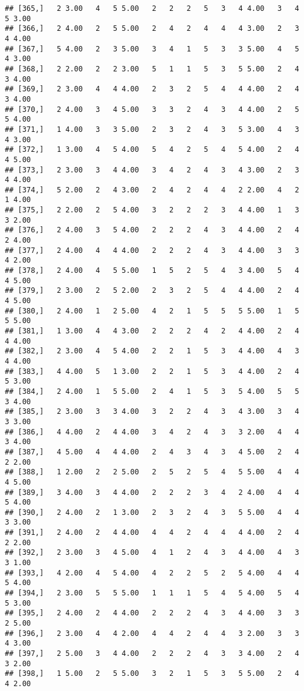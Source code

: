 \documentclass[]{article}
\begin{document}
\begin{verbatim}
## [365,]   2 3.00   4   5 5.00   2   2   2   5   3   4 4.00   3   4   5 3.00
## [366,]   2 4.00   2   5 5.00   2   4   2   4   4   4 3.00   2   3   4 4.00
## [367,]   5 4.00   2   3 5.00   3   4   1   5   3   3 5.00   4   5   4 3.00
## [368,]   2 2.00   2   2 3.00   5   1   1   5   3   5 5.00   2   4   3 4.00
## [369,]   2 3.00   4   4 4.00   2   3   2   5   4   4 4.00   2   4   3 4.00
## [370,]   2 4.00   3   4 5.00   3   3   2   4   3   4 4.00   2   5   5 4.00
## [371,]   1 4.00   3   3 5.00   2   3   2   4   3   5 3.00   4   3   4 3.00
## [372,]   1 3.00   4   5 4.00   5   4   2   5   4   5 4.00   2   4   4 5.00
## [373,]   2 3.00   3   4 4.00   3   4   2   4   3   4 3.00   2   3   4 4.00
## [374,]   5 2.00   2   4 3.00   2   4   2   4   4   2 2.00   4   2   1 4.00
## [375,]   2 2.00   2   5 4.00   3   2   2   2   3   4 4.00   1   3   3 2.00
## [376,]   2 4.00   3   5 4.00   2   2   2   4   3   4 4.00   2   4   2 4.00
## [377,]   2 4.00   4   4 4.00   2   2   2   4   3   4 4.00   3   3   4 2.00
## [378,]   2 4.00   4   5 5.00   1   5   2   5   4   3 4.00   5   4   4 5.00
## [379,]   2 3.00   2   5 2.00   2   3   2   5   4   4 4.00   2   4   4 5.00
## [380,]   2 4.00   1   2 5.00   4   2   1   5   5   5 5.00   1   5   5 5.00
## [381,]   1 3.00   4   4 3.00   2   2   2   4   2   4 4.00   2   4   4 4.00
## [382,]   2 3.00   4   5 4.00   2   2   1   5   3   4 4.00   4   3   4 4.00
## [383,]   4 4.00   5   1 3.00   2   2   1   5   3   4 4.00   2   4   5 3.00
## [384,]   2 4.00   1   5 5.00   2   4   1   5   3   5 4.00   5   5   3 4.00
## [385,]   2 3.00   3   3 4.00   3   2   2   4   3   4 3.00   3   4   3 3.00
## [386,]   4 4.00   2   4 4.00   3   4   2   4   3   3 2.00   4   4   3 4.00
## [387,]   4 5.00   4   4 4.00   2   4   3   4   3   4 5.00   2   4   2 2.00
## [388,]   1 2.00   2   2 5.00   2   5   2   5   4   5 5.00   4   4   4 5.00
## [389,]   3 4.00   3   4 4.00   2   2   2   3   4   2 4.00   4   4   5 4.00
## [390,]   2 4.00   2   1 3.00   2   3   2   4   3   5 5.00   4   4   3 3.00
## [391,]   2 4.00   2   4 4.00   4   4   2   4   4   4 4.00   2   4   2 2.00
## [392,]   2 3.00   3   4 5.00   4   1   2   4   3   4 4.00   4   3   3 1.00
## [393,]   4 2.00   4   5 4.00   4   2   2   5   2   5 4.00   4   4   5 4.00
## [394,]   2 3.00   5   5 5.00   1   1   1   5   4   5 4.00   5   4   5 3.00
## [395,]   2 4.00   2   4 4.00   2   2   2   4   3   4 4.00   3   3   2 5.00
## [396,]   2 3.00   4   4 2.00   4   4   2   4   4   3 2.00   3   3   4 3.00
## [397,]   2 5.00   3   4 4.00   2   2   2   4   3   3 4.00   2   4   3 2.00
## [398,]   1 5.00   2   5 5.00   3   2   1   5   3   5 5.00   2   4   4 2.00

\end{verbatim}
\end{document}
